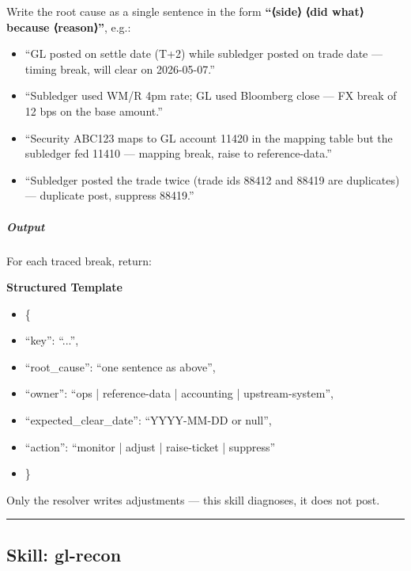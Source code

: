 \documentclass[11pt]{article}
\begin{document}
Write the root cause as a single sentence in the form \textbf{``⟨side⟩ ⟨did what⟩ because ⟨reason⟩''}, e.g.:


\begin{itemize}[leftmargin=*,itemsep=2pt,topsep=2pt]
\item {} ``GL posted on settle date (T+2) while subledger posted on trade date — timing break, will clear on 2026-05-07.''
\item {} ``Subledger used WM/R 4pm rate; GL used Bloomberg close — FX break of 12 bps on the base amount.''
\item {} ``Security ABC123 maps to GL account 11420 in the mapping table but the subledger fed 11410 — mapping break, raise to reference-data.''
\item {} ``Subledger posted the trade twice (trade ids 88412 and 88419 are duplicates) — duplicate post, suppress 88419.''
\end{itemize}

\subparagraph{Output}\mbox{}\par

For each traced break, return:


\textbf{Structured Template}
\begin{itemize}[leftmargin=*,itemsep=2pt,topsep=2pt]
\item {} \{
\item {} ``key'': ``...'',
\item {} ``root\_\allowbreak{}cause'': ``one sentence as above'',
\item {} ``owner'': ``ops | reference-data | accounting | upstream-system'',
\item {} ``expected\_\allowbreak{}clear\_\allowbreak{}date'': ``YYYY-MM-DD or null'',
\item {} ``action'': ``monitor | adjust | raise-ticket | suppress''
\item {} \}
\end{itemize}

Only the resolver writes adjustments — this skill diagnoses, it does not post.


\vspace{0.8em}\hrule\vspace{0.8em}

\subsection{Skill: gl-recon}\label{file:gl-reconciler-skills-gl-recon-SKILL-md}
\end{document}
